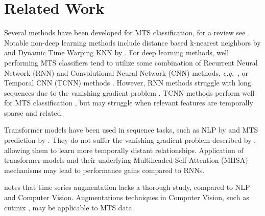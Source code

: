 \documentclass[letterpaper]{article} %
\newcommand{\eg}{{\textit{e.g.}}}
\begin{document}








\section{Related Work} 

Several methods have been developed for MTS classification, for a review see \cite{fawaz2019deep}. Notable non-deep learning methods include distance based k-nearest neighbors by \cite{orsenigo2010combining} and Dynamic Time Warping KNN by \cite{seto2015multivariate}. For deep learning methods, well performing MTS classifiers tend to utilize some combination of Recurrent Neural Network (RNN) and Convolutional Neural Network (CNN) methods, \eg~\cite{karim2017lstm}, or Temporal CNN (TCNN) methods  \cite{wang2017time}. However, RNN methods struggle with long sequences due to the vanishing gradient problem \cite{le2016quantifying}. TCNN methods perform well for MTS classification \cite{assaf2019mtex}, but may struggle when relevant features are temporally sparse and related.

Transformer models have been used in sequence tasks, such as NLP by \cite{devlin2018bert} and MTS prediction by \cite{zhou2021informer}. They do not suffer the vanishing gradient problem described by \cite{le2016quantifying}, allowing them to learn more temporally distant relationships. Application of transformer models and their underlying Multiheaded Self Attention (MHSA) mechanisms may lead to performance gains compared to RNNs. 

\cite{fawaz2019deep} notes that time series augmentation lacks a thorough study, compared to NLP and Computer Vision. Augmentations techniques in Computer Vision, such as cutmix \cite{yun2019cutmix}, may be applicable to MTS data. 
\end{document}
